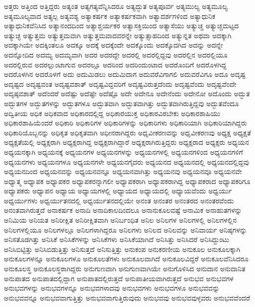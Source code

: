 {ಅತ್ತರು
ಅತ್ತಿಂದ
ಅತ್ತಿದ್ದರು
ಅತ್ಯಂತ
ಅತ್ಯಗತ್ಯವೆನ್ನಿಸಿದರೂ
ಅತ್ಯದ್ಭುತ
ಅತ್ಯಪೂರ್ವ
ಅತ್ಯಮುಲ್ಯ
ಅತ್ಯಮೂಲ್ಯ
ಅತ್ಯಮೂಲ್ಯವಾದ
ಅತ್ಯಲ್ಪ
ಅತ್ಯವಶ್ಯ
ಅತ್ಯಾಕರ್ಷಕ
ಅತ್ಯಾಕರ್ಷಕವಾಗಿ
ಅತ್ಯಾದರ್ಶಗಳಿಂದ
ಅತ್ಯಾಧುನಿಕ
ಅತ್ಯಾಧುನಿಕವೆನಿಸಿದ
ಅತ್ಯಾನಂದದಿಂದ
ಅತ್ಯಾಶ್ಚರ್ಯಕರ
ಅತ್ಯಾಸಕ್ತಿಯಿಂದ
ಅತ್ಯಾಸೆಯು
ಅತ್ಯುಚ್ಚ
ಅತ್ಯುಚ್ಚಮಟ್ಟದ
ಅತ್ಯುಚ್ಛ
ಅತ್ಯುತ್ತಮ
ಅತ್ಯುತ್ತಮವಾಗಿ
ಅತ್ಯುತ್ತಮವಾದವರನ್ನೇ
ಅತ್ಯುತ್ಸಾಹದಿಂದ
ಅತ್ಯುನ್ನತ
ಅಥವಾ
ಅದಕ್ಕಾಗಿ
ಅದಕ್ಕಾಗಿಯೇ
ಅದಕ್ಕಿಂತಲೂ
ಅದಕ್ಕೂ
ಅದಕ್ಕೆ
ಅದಕ್ಕೆಂದೇ
ಅದಕ್ಕೊಂದು
ಅದಕ್ಕೊದಗಿದ
ಅದನ್ನು
ಅದನ್ನೇ
ಅದನ್ನೋದಿದ
ಅದಮ್ಯ
ಅದಮ್ಯವಾಗಿ
ಅದರ
ಅದರದ್ದೇ
ಅದರಲ್ಲಿ
ಅದರಲ್ಲಿದ್ದವು
ಅದರಲ್ಲಿನ
ಅದರಲ್ಲಿಯೂ
ಅದರಲ್ಲಿರುವ
ಅದರಲ್ಲುಂಟಾಗುವ
ಅದರಲ್ಲೂ
ಅದರಿಂದ
ಅದರಿಂದುಂಟಾದ
ಅದರೊಂದಿಗೆ
ಅದರೊಳಗಿದ್ದ
ಅದರೊಳಗಿನ
ಅದರೊಳಗೆ
ಅದು
ಅದುಮಿಡಲು
ಅದುಮಿದಾಗ
ಅದುವರೆವಿಗಾಗಲಿ
ಅದುವರೆವಿಗೂ
ಅದೂ
ಅದೃಷ್ಟ
ಅದೃಷ್ಟದ
ಅದೃಷ್ಟವಂತ
ಅದೃಷ್ಟವಶಾತ್
ಅದೃಷ್ಟವಿದ್ದವರಿಗೆ
ಅದೃಷ್ಟವಿರುತ್ತದೆಂದು
ಅದೃಷ್ಟವೆಂದು
ಅದೃಷ್ಟವೆಂದೇ
ಅದೃಷ್ಠವಶಾತ್
ಅದೆಂದರೆ
ಅದೆಷ್ಟು
ಅದೆಷ್ಟೇ
ಅದೆಷ್ಟೊ
ಅದೇ
ಅದೇನೂ
ಅದೇನೆಂದು
ಅದೇನೋ
ಅದೊಂದು
ಅದ್ಭುತ
ಅದ್ಭುತಗಳ
ಅದ್ಭುತಗಳನ್ನು
ಅದ್ಭುತಗಳೂ
ಅದ್ಭುತವಾಗಿ
ಅದ್ಭುತವಾಗಿತ್ತು
ಅದ್ಭುತವಾಗಿರುತ್ತಿದ್ದವು
ಅದ್ಭುತವೆಂದೂ
ಅದ್ವಿತೀಯ
ಅಧಿಕ
ಅಧಿಕವಾದ
ಅಧಿಕಾರದಲ್ಲಿದ್ದ
ಅಧಿಕಾರಯುಕ್ತ
ಅಧಿಕಾರವಿರಬೇಕು
ಅಧಿಕಾರಶಾಹಿಯು
ಅಧಿಕಾರಶಾಹಿಯೆಂದರೆ
ಅಧಿಕಾರಿ
ಅಧಿಕಾರಿಗಳ
ಅಧಿಕಾರಿಗಳನ್ನು
ಅಧಿಕಾರಿಗಳು
ಅಧಿಕಾರಿಯಾಗಿ
ಅಧಿಕಾರಿಯಾಗಿದ್ದರು
ಅಧಿಕಾರಿಯೊಬ್ಬನನ್ನು
ಅಧಿಕೃತ
ಅಧಿಕೃತವಾಗಿ
ಅಧೀನರಾಗಿದ್ದರು
ಅಧೃವೀಕರಣವನ್ನು
ಅಧೃವೀಕರಣವು
ಅಧ್ಯಕ್ಷ
ಅಧ್ಯಕ್ಷತೆ
ಅಧ್ಯಕ್ಷತೆಯಲ್ಲಿ
ಅಧ್ಯಕ್ಷರಾಗಿ
ಅಧ್ಯಕ್ಷರಾಗಿದ್ದ
ಅಧ್ಯಕ್ಷರಾಗಿದ್ದಾರೆ
ಅಧ್ಯಕ್ಷರಾಗಿರುತ್ತಿದ್ದರು
ಅಧ್ಯಕ್ಷರಾದ
ಅಧ್ಯಕ್ಷರು
ಅಧ್ಯಯನ
ಅಧ್ಯಯನಕ್ಕಾಗಿ
ಅಧ್ಯಯನಕ್ಕೆ
ಅಧ್ಯಯನಗಳ
ಅಧ್ಯಯನಗಳನ್ನು
ಅಧ್ಯಯನಗಳಲ್ಲಿ
ಅಧ್ಯಯನಗಳಿಂದ
ಅಧ್ಯಯನಗಳಿಗೆ
ಅಧ್ಯಯನಗಳು
ಅಧ್ಯಯನಗಳೂ
ಅಧ್ಯಯನಗಳೇ
ಅಧ್ಯಯನಗೈದರು
ಅಧ್ಯಯನದ
ಅಧ್ಯಯನದಲ್ಲಿ
ಅಧ್ಯಯನದಲ್ಲಿದ್ದವು
ಅಧ್ಯಯನದಿಂದ
ಅಧ್ಯಯನವನ್ನು
ಅಧ್ಯಯನವನ್ನೂ
ಅಧ್ಯಯನವಾಗಿತ್ತು
ಅಧ್ಯಯನವು
ಅಧ್ಯಯನವೂ
ಅಧ್ಯಯನವೇ
ಅಧ್ಯಾತ್ಮ
ಅಧ್ಯಾಪಕ
ಅಧ್ಯಾಪಕರ
ಅಧ್ಯಾಪಕರನ್ನಾಗಲೀ
ಅಧ್ಯಾಪಕರಾಗಿ
ಅಧ್ಯಾಪಕರಾಗಿದ್ದ
ಅಧ್ಯಾಪಕರಾದ
ಅಧ್ಯಾಪಕರಿಗೂ
ಅಧ್ಯಾಪಕರು
ಅಧ್ಯಾಪನ
ಅಧ್ಯಾಯ
ಅಧ್ಯಾಯಗಳಲ್ಲಿ
ಅಧ್ಯಾಯದ
ಅಧ್ಯಾಯದಲ್ಲಿ
ಅಧ್ಯಾಯವೆಂದು
ಅಧ್ವರ್ಯು
ಅಧ್ವರ್ಯುಗಳು
ಅಧ್ವರ್ಯುತನದಲ್ಲಿ
ಅಧ್ವರ್ಯುತನದಲ್ಲಿಯೇ
ಅನಂತ
ಅನಂತರ
ಅನಂತರದ
ಅನಂತರವೆಂದು
ಅನಂತವಾಗಿರುತ್ತದೆ
ಅನಾಕರ್ಷಕ
ಅನಾದಿ
ಅನಾದಿಕಾಲದಿಂದಲೂ
ಅನಾನುಕೂಲವಷ್ಟೆ
ಅನಾಮಿಕ
ಅನಾಹುತಗಳನ್ನು
ಅನಿಮಿಯ
ಅನಿಯತ
ಅನಿರೀಕ್ಷಿತ
ಅನಿರೀಕ್ಷಿತವಾಗಿ
ಅನಿರ್ಬಂಧಿತ
ಅನಿಲ
ಅನಿಲಗಳ
ಅನಿಲಗಳಲ್ಲಿ
ಅನಿಲಗಳಲ್ಲಿನ
ಅನಿಲಗಳಲ್ಲಿಯೂ
ಅನಿಲಗಳಲ್ಲೂ
ಅನಿಲಗಳಾಗಿದ್ದರೂ
ಅನಿಲಗಳು
ಅನಿಲದ
ಅನಿಲವನ್ನು
ಅನಿವಾರ್ಯ
ಅನಿಷ್ಠಗಳನ್ನು
ಅನಿಸತೊಡಗಿತ್ತು
ಅನಿಸಿಕೆ
ಅನಿಸಿಕೆಗಳನ್ನು
ಅನಿಸಿಕೆಗಳು
ಅನಿಸಿಕೆಯಾಗಿದೆ
ಅನಿಸಿತ್ತು
ಅನಿಸಿದರೆ
ಅನಿಸಿದ್ದುಂಟು
ಅನಿಸಿಬಿಟ್ಟಿತ್ತು
ಅನಿಸಿಬಿಡುತ್ತಿತ್ತು
ಅನಿಸುತ್ತದೆ
ಅನಿಸುತ್ತಿತ್ತು
ಅನುಕಂಪ
ಅನುಕರಣೀಯ
ಅನುಕೂಲ
ಅನುಕೂಲಕ್ಕಾಗಿ
ಅನುಕೂಲಗಳನ್ನೂ
ಅನುಕೂಲಗಳೂ
ಅನುಕೂಲತೆಗಳು
ಅನುಕೂಲವಾಗಿದೆ
ಅನುಕೂಲವಿದ್ದರೆ
ಅನುಕೂಲವೆನಿಸಿದರೂ
ಅನುಕೂಲಸ್ಥ
ಅನುಕೂಲಸ್ಥರಾಗಿದ್ದರು
ಅನುಗುಣವಾಗಿ
ಅನುಗುಣವಾಗಿಯೇ
ಅನುಗೊಳಿಸಿದ
ಅನುದಾನ
ಅನುದಾನಿತ
ಅನುಪಾತದ
ಅನುಪಾತದಲ್ಲಿದ್ದಾಗ
ಅನುಪಾತದಲ್ಲಿರುತ್ತದೆ
ಅನುಪಾತೀಯವಾಗಿರುತ್ತದೆ
ಅನುಭವ
ಅನುಭವಗಳ
ಅನುಭವಗಳನ್ನು
ಅನುಭವಗಳನ್ನೂ
ಅನುಭವಗಳಾದವು
ಅನುಭವಗಳು
ಅನುಭವಗಳೂ
ಅನುಭವವನ್ನು
ಅನುಭವವನ್ನೂ
ಅನುಭವವಾಗುತ್ತಿತ್ತು
ಅನುಭವವಾಗುತ್ತಿರುವುದು
ಅನುಭವವು
ಅನುಭವವುಳ್ಳವರು
ಅನುಭವವೆಂದರೆ
}
